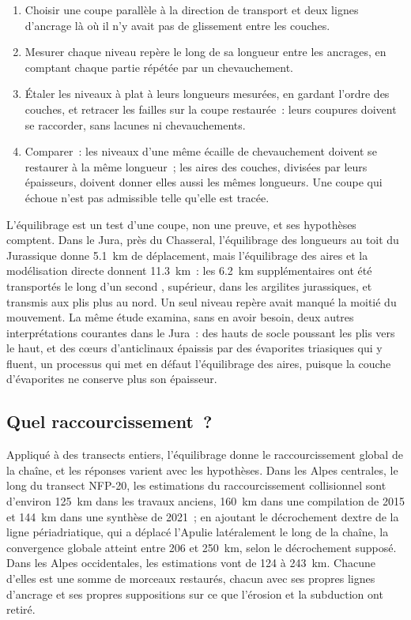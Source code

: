 \begin{method}\label{met:b2:alpine-orogen:restore}
\begin{enumerate}
\item Choisir une coupe parallèle à la direction de transport et deux lignes d'ancrage là où il n'y
avait pas de glissement entre les couches.
\item Mesurer chaque niveau repère le long de sa longueur entre les ancrages, en comptant chaque partie
répétée par un chevauchement.
\item Étaler les niveaux à plat à leurs longueurs mesurées, en gardant l'ordre des couches,
et retracer les failles sur la coupe restaurée~: leurs coupures doivent se raccorder, sans lacunes
ni chevauchements.
\item Comparer~: les niveaux d'une même écaille de chevauchement doivent se restaurer à la même longueur~; les aires des
couches, divisées par leurs épaisseurs, doivent donner elles aussi les mêmes longueurs. Une coupe qui
échoue n'est pas admissible telle qu'elle est tracée.
\end{enumerate}
\end{method}

L'équilibrage est un test d'une coupe, non une preuve, et ses hypothèses comptent. Dans le Jura, près du
Chasseral, l'équilibrage des longueurs au toit du Jurassique donne \qty{5.1}{km} de
déplacement, mais l'équilibrage des aires et la modélisation directe donnent \qty{11.3}{km}~: les
\qty{6.2}{km} supplémentaires ont été transportés le long d'un second , supérieur, dans les argilites jurassiques, et transmis
aux plis plus au nord. Un seul niveau repère avait manqué la moitié du mouvement. La même étude
examina, sans en avoir besoin, deux autres interprétations courantes dans le Jura~: des hauts de socle poussant
les plis vers le haut, et des cœurs d'anticlinaux épaissis par des évaporites triasiques qui y fluent, un
processus qui met en défaut l'équilibrage des aires, puisque la couche d'évaporites ne conserve plus son
épaisseur.

\subsection*{Quel raccourcissement~?}

Appliqué à des transects entiers, l'équilibrage donne le raccourcissement global de la chaîne, et les réponses
varient avec les hypothèses. Dans les Alpes centrales, le long du transect NFP-20, les estimations
du raccourcissement collisionnel sont d'environ \qty{125}{km} dans les travaux anciens, \qty{160}{km} dans
une compilation de 2015 et \qty{144}{km} dans une synthèse de 2021~; en ajoutant le décrochement dextre de la ligne périadriatique, qui
a déplacé l'Apulie latéralement le long de la chaîne, la convergence globale atteint entre 206 et
\qty{250}{km}, selon le décrochement supposé. Dans les Alpes occidentales, les estimations vont de 124 à
\qty{243}{km}. Chacune d'elles est une somme de morceaux restaurés, chacun avec ses propres lignes
d'ancrage et ses propres suppositions sur ce que l'érosion et la subduction ont retiré.

